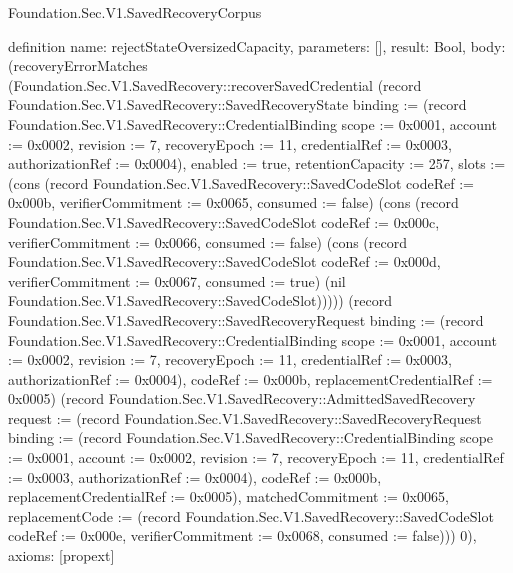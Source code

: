 \begin{lexlean}{Foundation.Sec.V1.SavedRecoveryCorpus}
\begin{semanticmodule}
definition{
  name: rejectStateOversizedCapacity,
  parameters: [],
  result: Bool,
  body: (recoveryErrorMatches (Foundation.Sec.V1.SavedRecovery::recoverSavedCredential (record Foundation.Sec.V1.SavedRecovery::SavedRecoveryState {binding := (record Foundation.Sec.V1.SavedRecovery::CredentialBinding {scope := 0x0001, account := 0x0002, revision := 7, recoveryEpoch := 11, credentialRef := 0x0003, authorizationRef := 0x0004}), enabled := true, retentionCapacity := 257, slots := (cons (record Foundation.Sec.V1.SavedRecovery::SavedCodeSlot {codeRef := 0x000b, verifierCommitment := 0x0065, consumed := false}) (cons (record Foundation.Sec.V1.SavedRecovery::SavedCodeSlot {codeRef := 0x000c, verifierCommitment := 0x0066, consumed := false}) (cons (record Foundation.Sec.V1.SavedRecovery::SavedCodeSlot {codeRef := 0x000d, verifierCommitment := 0x0067, consumed := true}) (nil Foundation.Sec.V1.SavedRecovery::SavedCodeSlot))))}) (record Foundation.Sec.V1.SavedRecovery::SavedRecoveryRequest {binding := (record Foundation.Sec.V1.SavedRecovery::CredentialBinding {scope := 0x0001, account := 0x0002, revision := 7, recoveryEpoch := 11, credentialRef := 0x0003, authorizationRef := 0x0004}), codeRef := 0x000b, replacementCredentialRef := 0x0005}) (record Foundation.Sec.V1.SavedRecovery::AdmittedSavedRecovery {request := (record Foundation.Sec.V1.SavedRecovery::SavedRecoveryRequest {binding := (record Foundation.Sec.V1.SavedRecovery::CredentialBinding {scope := 0x0001, account := 0x0002, revision := 7, recoveryEpoch := 11, credentialRef := 0x0003, authorizationRef := 0x0004}), codeRef := 0x000b, replacementCredentialRef := 0x0005}), matchedCommitment := 0x0065, replacementCode := (record Foundation.Sec.V1.SavedRecovery::SavedCodeSlot {codeRef := 0x000e, verifierCommitment := 0x0068, consumed := false})})) 0),
  axioms: [propext]
}


\end{semanticmodule}
\end{lexlean}
